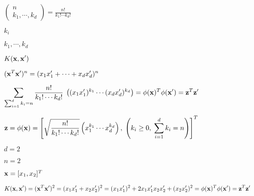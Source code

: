 \documentclass{article}
\def\lthtmlcheckvsize{\ifdim\ht\sizebox<\vsize 
  \ifdim\wd\sizebox<\hsize\expandafter\hfill\fi \expandafter\vfill
  \else\expandafter\vss\fi}%
\begin{document}
{\newpage\clearpage
{}%
$\displaystyle \left(\begin{array}{c}n\\k_1,\cdots,k_d\end{array}\right)
=\frac{n!}{k_1!\cdots k_d!}$%
\lthtmlindisplaymathZ
\lthtmlcheckvsize\clearpage}

{\newpage\clearpage
{}%
$ k_i$%
\lthtmlindisplaymathZ
\lthtmlcheckvsize\clearpage}

{\newpage\clearpage
{}%
$ k_1,\cdots,k_d$%
\lthtmlindisplaymathZ
\lthtmlcheckvsize\clearpage}

{\newpage\clearpage
{}%
$\displaystyle K({\bf x},{\bf x}')$%
\lthtmlindisplaymathZ
\lthtmlcheckvsize\clearpage}

{\newpage\clearpage
{}%
$\displaystyle ({\bf x}^T{\bf x}')^n=(x_1x'_1+\cdots+x_dx'_d)^n$%
\lthtmlindisplaymathZ
\lthtmlcheckvsize\clearpage}

{\newpage\clearpage
{}%
$\displaystyle \sum_{\sum_{i=1}^d k_i=n}\frac{n!}{k_1!\cdots k_d!}\;
\left( (x_1x'_1)^{k_1}\cdots (x_dx'_d)^{k_d} \right)
=\phi({\bf x})^T \phi({\bf x}')={\bf z}^T{\bf z}'$%
\lthtmlindisplaymathZ
\lthtmlcheckvsize\clearpage}

{\newpage\clearpage
{}%
$\displaystyle {\bf z}=\phi({\bf x})=\left[\sqrt{ \frac{n!}{k_1!\cdots k_d!} }
\left(x_1^{k_1}\cdots x_d^{k_d}\right),\;\left(k_i\ge 0,\;\sum_{i=1}^d k_i=n\right)\right]^T$%
\lthtmlindisplaymathZ
\lthtmlcheckvsize\clearpage}

{\newpage\clearpage
{}%
$ d=2$%
\lthtmlindisplaymathZ
\lthtmlcheckvsize\clearpage}

{\newpage\clearpage
{}%
$ n=2$%
\lthtmlindisplaymathZ
\lthtmlcheckvsize\clearpage}

{\newpage\clearpage
{}%
$ {\bf x}=[x_1,x_2]^T$%
\lthtmlindisplaymathZ
\lthtmlcheckvsize\clearpage}

{\newpage\clearpage
{}%
$\displaystyle K({\bf x},{\bf x}')=({\bf x}^T{\bf x}')^2=(x_1x'_1+x_2x'_2)^2
=(x_1 x'_1)^2+2x_1 x'_1 x_2 x'_2+(x_2 x'_2)^2=\phi({\bf x})^T \phi({\bf x}')
={\bf z}^T{\bf z}'$%
\lthtmlindisplaymathZ
\lthtmlcheckvsize\clearpage}
\end{document}
